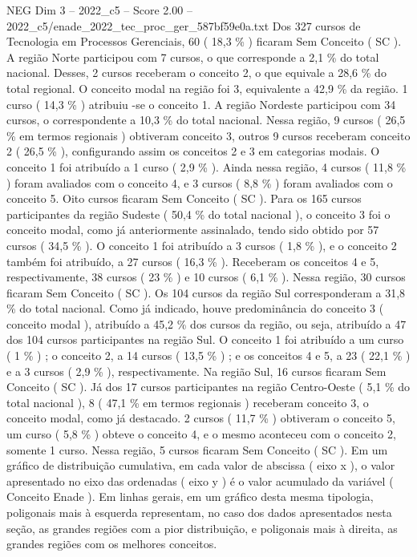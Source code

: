 \begin{textsample}{NEG Dim 3 – 2022\_c5 – Score 2.00 – 2022\_c5/enade\_2022\_tec\_proc\_ger\_587bf59e0a.txt}
Dos 327 cursos de Tecnologia em Processos Gerenciais, 60 ( 18,3 \% ) ficaram Sem Conceito ( SC ).
A região Norte participou com 7 cursos, o que corresponde a 2,1 \% do total nacional.
Desses, 2 cursos receberam o conceito 2, o que equivale a 28,6 \% do total regional.
O conceito modal na região foi 3, equivalente a 42,9 \% da região. 1 curso ( 14,3 \% ) atribuiu -se o conceito 1.
A região Nordeste participou com 34 cursos, o correspondente a 10,3 \% do total nacional.
Nessa região, 9 cursos ( 26,5 \% em termos regionais ) obtiveram conceito 3, outros 9 cursos receberam conceito 2 ( 26,5 \% ), configurando assim os conceitos 2 e 3 em categorias modais.
O conceito 1 foi atribuído a 1 curso ( 2,9 \% ).
Ainda nessa região, 4 cursos ( 11,8 \% ) foram avaliados com o conceito 4, e 3 cursos ( 8,8 \% ) foram avaliados com o conceito 5.
Oito cursos ficaram Sem Conceito ( SC ).
Para os 165 cursos participantes da região Sudeste ( 50,4 \% do total nacional ), o conceito 3 foi o conceito modal, como já anteriormente assinalado, tendo sido obtido por 57 cursos ( 34,5 \% ).
O conceito 1 foi atribuído a 3 cursos ( 1,8 \% ), e o conceito 2 também foi atribuído, a 27 cursos ( 16,3 \% ).
Receberam os conceitos 4 e 5, respectivamente, 38 cursos ( 23 \% ) e 10 cursos ( 6,1 \% ).
Nessa região, 30 cursos ficaram Sem Conceito ( SC ).
Os 104 cursos da região Sul corresponderam a 31,8 \% do total nacional.
Como já indicado, houve predominância do conceito 3 ( conceito modal ), atribuído a 45,2 \% dos cursos da região, ou seja, atribuído a 47 dos 104 cursos participantes na região Sul.
O conceito 1 foi atribuído a um curso ( 1 \% ) ; o conceito 2, a 14 cursos ( 13,5 \% ) ; e os conceitos 4 e 5, a 23 ( 22,1 \% ) e a 3 cursos ( 2,9 \% ), respectivamente.
Na região Sul, 16 cursos ficaram Sem Conceito ( SC ).
Já dos 17 cursos participantes na região Centro-Oeste ( 5,1 \% do total nacional ), 8 ( 47,1 \% em termos regionais ) receberam conceito 3, o conceito modal, como já destacado. 2 cursos ( 11,7 \% ) obtiveram o conceito 5, um curso ( 5,8 \% ) obteve o conceito 4, e o mesmo aconteceu com o conceito 2, somente 1 curso.
Nessa região, 5 cursos ficaram Sem Conceito ( SC ).
Em um gráfico de distribuição cumulativa, em cada valor de abscissa ( eixo x ), o valor apresentado no eixo das ordenadas ( eixo y ) é o valor acumulado da variável ( Conceito Enade ).
Em linhas gerais, em um gráfico desta mesma tipologia, poligonais mais à esquerda representam, no caso dos dados apresentados nesta seção, as grandes regiões com a pior distribuição, e poligonais mais à direita, as grandes regiões com os melhores conceitos.

\end{textsample}
